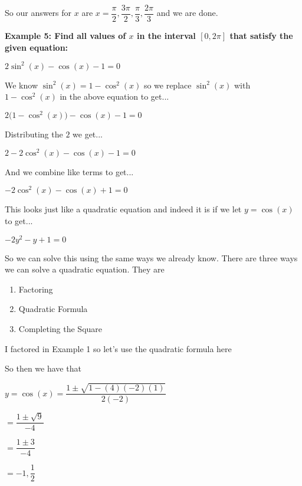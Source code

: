 \documentclass[12pt]{article}
\begin{document}
So our answers for $x$ are $x = \dfrac{\pi}{2}, \dfrac{3\pi}{2},  \dfrac{\pi}{3}, \dfrac{2\pi}{3}$ and we are done.

\textbf{Example 5: Find all values of $x$ in the interval $[0, 2\pi]$ that satisfy the given equation:}
\newline

\centerline{$2\sin^{2}(x) - \cos(x) - 1 = 0$}
 
We know $\sin^{2}(x) = 1 - \cos^{2}(x)$ so we replace  $\sin^{2}(x)$ with $1 - \cos^{2}(x)$ in the above equation to get...
\newline

\centerline{$2\Big(1 - \cos^{2}(x)\Big) - \cos(x) - 1 = 0$}

Distributing the $2$ we get...
\newline

\centerline{$2 - 2\cos^{2}(x)- \cos(x) - 1 = 0$}

And we combine like terms to get...
\newline

\centerline{$-2\cos^{2}(x) - \cos(x) + 1 = 0$}

This looks just like a quadratic equation and indeed it is if we let $y = \cos(x)$ to get...
\newline

\centerline{$-2y^2 - y + 1 = 0$}

So we can solve this using the same ways we already know. There are three ways we can solve a quadratic equation. They are

\begin{enumerate}
\item Factoring
\item Quadratic Formula
\item Completing the Square
\end{enumerate}

I factored in Example 1 so let's use the quadratic formula here

So then we have that
\newline

\centerline{$y = \cos(x) = \dfrac{1 \pm \sqrt{1 - (4)(-2)(1)}}{2(-2)}$}

\hspace{5.5cm} $ = \dfrac{1 \pm \sqrt{9}}{-4}$

\hspace{5.5cm} $ = \dfrac{1 \pm 3}{-4}$

\hspace{5.5cm} $ = -1, \dfrac{1}{2}$
\end{document}
